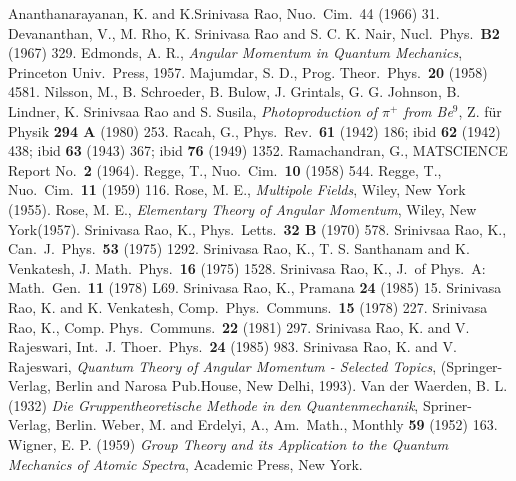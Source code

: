 \begin{thebibliography}{99}
 Ananthanarayanan, K. and K.Srinivasa Rao, Nuo.\ Cim.\ 44 (1966) 31.
 Devananthan, V., M. Rho, K. Srinivasa Rao and S. C. K. Nair, Nucl.\ Phys.\ {\bf B2} (1967) 329.
 Edmonds, A. R., \textit{Angular Momentum in Quantum Mechanics}, Princeton Univ.\ Press, 1957.
 Majumdar, S. D., Prog. Theor.\ Phys.\ {\bf 20} (1958) 4581.
 Nilsson, M., B. Schroeder, B. Bulow, J. Grintals, G. G. Johnson, B. Lindner, K. Srinivsaa Rao and S. Susila, \textit{Photoproduction of $\pi^+$ from Be$^9$}, Z. f\"{u}r Physik {\bf 294 A} (1980) 253.
 Racah, G., Phys.\ Rev.\ {\bf 61} (1942) 186; ibid {\bf 62} (1942) 438; ibid {\bf 63} (1943) 367; ibid {\bf 76} (1949) 1352.
 Ramachandran, G., MATSCIENCE Report No.\ {\bf 2} (1964).
 Regge, T., Nuo.\ Cim.\ {\bf 10} (1958) 544.
 Regge, T., Nuo.\ Cim.\ {\bf 11} (1959) 116.
 Rose, M. E., \textit{Multipole Fields}, Wiley, New York (1955).
 Rose, M. E., \textit{Elementary Theory of Angular Momentum}, Wiley, New York(1957).
 Srinivasa Rao, K., Phys.\ Letts.\ {\bf 32 B} (1970) 578.
 Srinivsaa Rao, K., Can.\ J.\ Phys.\ {\bf 53} (1975) 1292.
 Srinivasa Rao, K., T. S. Santhanam and K. Venkatesh, J. Math.\ Phys.\ {\bf 16} (1975) 1528.
 Srinivasa Rao, K., J.\ of Phys.\ A: Math.\ Gen.\ {\bf 11} (1978) L69.
 Srinivasa Rao, K., Pramana {\bf 24} (1985) 15.
 Srinivasa Rao, K. and K. Venkatesh, Comp.\ Phys.\ Communs.\ {\bf 15} (1978) 227.
 Srinivasa Rao, K., Comp. Phys.\ Communs.\ {\bf 22} (1981) 297.
 Srinivasa Rao, K. and V. Rajeswari, Int.\ J. Thoer.\ Phys.\ {\bf 24} (1985) 983.
 Srinivasa Rao, K. and V. Rajeswari, \textit{Quantum Theory of Angular Momentum - Selected Topics}, (Springer-Verlag, Berlin and Narosa Pub.House, New Delhi, 1993).
 Van der Waerden, B. L. (1932) \textit{Die Gruppentheoretische Methode in den Quantenmechanik}, Spriner-Verlag, Berlin.
 Weber, M. and Erdelyi, A., Am.\ Math., Monthly {\bf 59} (1952) 163.
 Wigner, E. P. (1959) \textit{Group Theory and its Application to the Quantum Mechanics of Atomic Spectra}, Academic Press, New York.
\end{thebibliography}
\vskip 1cm

